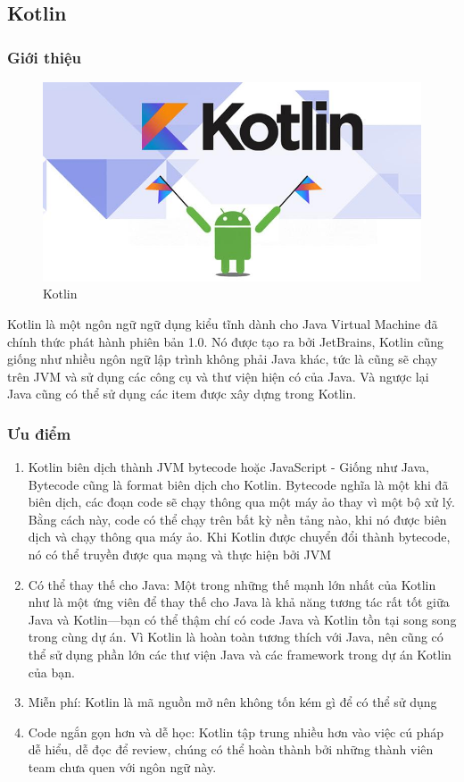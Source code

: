 \subsection{Kotlin}
    \subsubsection{Giới thiệu}
        \begin{figure}[h]
            \centering
            \includegraphics[width=0.99\linewidth]{images/appropriate framework/kotin.jpg}
            \caption{Kotlin}
        \end{figure}
        Kotlin là một ngôn ngữ ngữ dụng kiểu tĩnh dành cho Java Virtual Machine đã chính thức phát hành phiên bản 1.0. Nó được tạo ra bởi JetBrains, Kotlin cũng giống như nhiều ngôn ngữ lập trình không phải Java khác, tức là cũng sẽ chạy trên JVM và sử dụng các công cụ và thư viện hiện có của Java. Và ngược lại Java cũng có thể sử dụng các item được xây dựng trong Kotlin.
    \subsubsection{Ưu điểm}
        \begin{enumerate}
            \item Kotlin biên dịch thành JVM bytecode hoặc JavaScript - Giống như Java, Bytecode cũng là format biên dịch cho Kotlin. Bytecode nghĩa là một khi đã biên dịch, các đoạn code sẽ chạy thông qua một máy ảo thay vì một bộ xử lý. Bằng cách này, code có thể chạy trên bất kỳ nền tảng nào, khi nó được biên dịch và chạy thông qua máy ảo. Khi Kotlin được chuyển đổi thành bytecode, nó có thể truyền được qua mạng và thực hiện bởi JVM
            \item Có thể thay thế cho Java: Một trong những thế mạnh lớn nhất của Kotlin như là một ứng viên để thay thế cho Java là khả năng tương tác rất tốt giữa Java và Kotlin—bạn có thể thậm chí có code Java và Kotlin tồn tại song song trong cùng dự án. Vì Kotlin là hoàn toàn tương thích với Java, nên cũng có thể sử dụng phần lớn các thư viện Java và các framework trong dự án Kotlin của bạn.
            \item Miễn phí: Kotlin là mã nguồn mở nên không tốn kém gì để có thể sử dụng
            \item Code ngắn gọn hơn và dễ học: Kotlin tập trung nhiều hơn vào việc cú pháp dễ hiểu, dễ đọc để review, chúng có thể hoàn thành bởi những thành viên team chưa quen với ngôn ngữ này.
        \end{enumerate}
